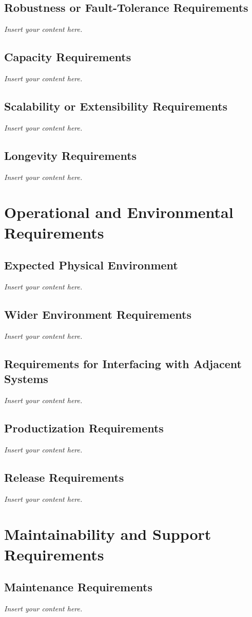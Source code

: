 \documentclass[12pt]{article}
\newcommand{\lips}{\textit{Insert your content here.}}
\begin{document}
\subsection{Robustness or Fault-Tolerance Requirements}
\lips
\subsection{Capacity Requirements}
\lips
\subsection{Scalability or Extensibility Requirements}
\lips
\subsection{Longevity Requirements}
\lips

\section{Operational and Environmental Requirements}
\subsection{Expected Physical Environment}
\lips
\subsection{Wider Environment Requirements}
\lips
\subsection{Requirements for Interfacing with Adjacent Systems}
\lips
\subsection{Productization Requirements}
\lips
\subsection{Release Requirements}
\lips

\section{Maintainability and Support Requirements}
\subsection{Maintenance Requirements}
\lips
\end{document}
